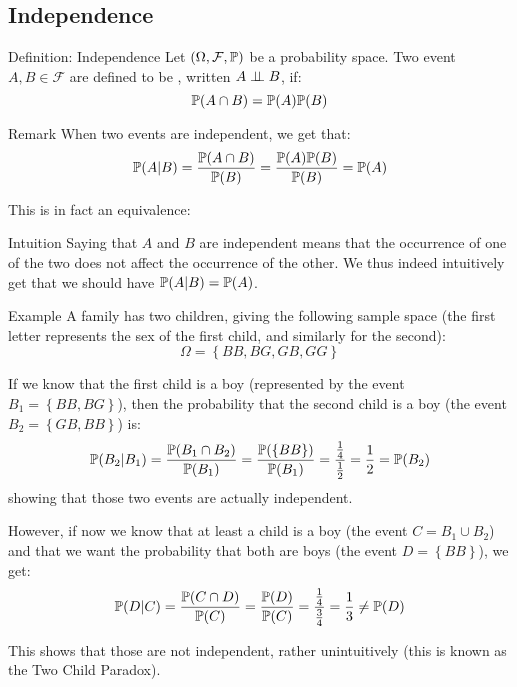 \documentclass[a4paper]{article}
\begin{document}
\subsection{Independence}
\begin{parag}{Definition: Independence}
    Let $\left(\Omega, \mathcal{F}, \prob\right)$ be a probability space. Two event $A, B \in \mathcal{F}$ are defined to be , written $A \mathrel{\perp\!\!\!\perp} B$, if: 
    \[\prob\left(A \cap B\right) = \prob\left(A\right)\prob\left(B\right)\]
    
    \begin{subparag}{Remark}
        When two events are independent, we get that: 
        \[\prob\left(A|B\right) = \frac{\prob\left(A \cap B\right)}{\prob\left(B\right)} = \frac{\prob\left(A\right)\prob\left(B\right)}{\prob\left(B\right)} = \prob\left(A\right)\]

        This is in fact an equivalence: 
    \end{subparag}

    \begin{subparag}{Intuition}
        Saying that $A$ and $B$ are independent means that the occurrence of one of the two does not affect the occurrence of the other. We thus indeed intuitively get that we should have $\prob\left(A|B\right) = \prob\left(A\right)$.
    \end{subparag}
\end{parag}

\begin{parag}{Example}
    A family has two children, giving the following sample space (the first letter represents the sex of the first child, and similarly for the second): 
    \[\Omega = \left\{BB, BG, GB, GG\right\}\]

    If we know that the first child is a boy (represented by the event $B_1 = \left\{BB, BG\right\}$), then the probability that the second child is a boy (the event $B_2 = \left\{GB, BB\right\}$) is: 
    \[\prob\left(B_2|B_1\right) = \frac{\prob\left(B_1 \cap B_2\right)}{\prob\left(B_1\right)} = \frac{\prob\left(\left\{BB\right\}\right)}{\prob\left(B_1\right)} = \frac{\frac{1}{4}}{\frac{1}{2}} = \frac{1}{2} = \prob\left(B_2\right)\]
    showing that those two events are actually independent.

    However, if now we know that at least a child is a boy (the event $C = B_1 \cup B_2$) and that we want the probability that both are boys (the event $D = \left\{BB\right\}$), we get: 
    \[\prob\left(D|C\right) = \frac{\prob\left(C \cap D\right)}{\prob\left(C\right)} = \frac{\prob\left(D\right)}{\prob\left(C\right)} = \frac{\frac{1}{4}}{\frac{3}{4}} = \frac{1}{3} \neq \prob\left(D\right)\]
    
    This shows that those are not independent, rather unintuitively (this is known as the Two Child Paradox).
\end{parag}
\end{document}
